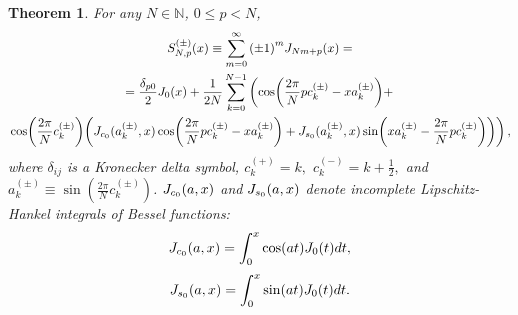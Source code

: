 \documentclass{article}
\newtheorem{theorem}{Theorem}
\begin{document}
\begin{theorem}
\label{theorem:series}
For any $N \in \mathbb{N}$, $0 \le p < N$,
\begin{multline}
\label{eq:series} 
S^{(\pm)}_{N,p}(x) \equiv \sum_{m=0}^{\infty} \qty(\pm 1)^m J_{Nm+p}(x) = \\
= \frac{\delta_{p0}}{2} J_0(x) + \frac{1}{2N} \sum_{k=0}^{N-1} \left(\cos(\frac{2\pi}{N} p c^{(\pm)}_k - x a^{(\pm)}_k) + \right.\\
\left.\cos(\frac{2\pi}{N} c^{(\pm)}_k) \qty(\JC0(a^{(\pm)}_k, x) \cos(\frac{2\pi}{N} p c^{(\pm)}_k - x a^{(\pm)}_k) + \JS0(a^{(\pm)}_k, x) \sin(x a^{(\pm)}_k - \frac{2\pi}{N} p c^{(\pm)}_k))\right),
\end{multline}
where $\delta_{ij}$ is a Kronecker delta symbol, $c_k^{(+)} = k,$ $c_k^{(-)} = k+\frac{1}{2},$
and $a^{(\pm)}_k \equiv \sin(\frac{2\pi}{N}c^{(\pm)}_k)$. $\JC0(a, x)$ and $\JS0(a, x)$ denote incomplete Lipschitz-Hankel integrals of Bessel functions:
\begin{equation}
\label{eq:jc0}
\JC0(a, x) = \int_0^x \cos(a t) J_0(t) dt,
\end{equation}
\begin{equation}
\label{eq:js0}
\JS0(a, x) = \int_0^x \sin(a t) J_0(t) dt.
\end{equation}
\end{theorem}
\end{document}
